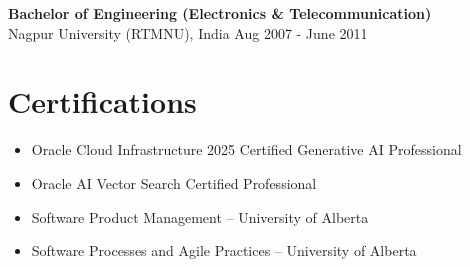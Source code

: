 \documentclass[11pt,a4paper]{article}
\begin{document}
\textbf{Bachelor of Engineering (Electronics \& Telecommunication)} \\
Nagpur University (RTMNU), India \hfill Aug 2007 - June 2011

\section*{Certifications}

\begin{itemize}
    \item Oracle Cloud Infrastructure 2025 Certified Generative AI Professional
    
    \item Oracle AI Vector Search Certified Professional
    
    \item Software Product Management -- University of Alberta
    
    \item Software Processes and Agile Practices -- University of Alberta
\end{itemize}
\end{document}
